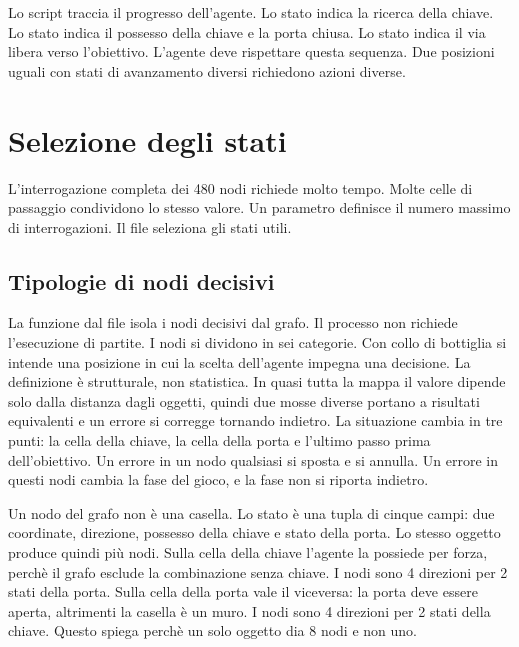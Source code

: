 \documentclass[12pt,a4paper]{article}
\begin{document}
Lo script  traccia il progresso dell'agente. Lo stato  indica la ricerca della chiave. Lo stato  indica il possesso della chiave e la porta chiusa. Lo stato  indica il via libera verso l'obiettivo. L'agente deve rispettare questa sequenza. Due posizioni uguali con stati di avanzamento diversi richiedono azioni diverse.

\section{Selezione degli stati}\label{sec:stati}
L'interrogazione completa dei 480 nodi richiede molto tempo. Molte celle di passaggio condividono lo stesso valore. Un parametro definisce il numero massimo di interrogazioni. Il file  seleziona gli stati utili.

\subsection{Tipologie di nodi decisivi}\label{subsec:bottleneck}
La funzione  dal file  isola i nodi decisivi dal grafo. Il processo non richiede l'esecuzione di partite. I nodi si dividono in sei categorie.
Con collo di bottiglia si intende una posizione in cui la scelta dell'agente impegna una decisione. La definizione \`e strutturale, non statistica. In quasi tutta la mappa il valore dipende solo dalla distanza dagli oggetti, quindi due mosse diverse portano a risultati equivalenti e un errore si corregge tornando indietro. La situazione cambia in tre punti: la cella della chiave, la cella della porta e l'ultimo passo prima dell'obiettivo. Un errore in un nodo qualsiasi si sposta e si annulla. Un errore in questi nodi cambia la fase del gioco, e la fase non si riporta indietro.

Un nodo del grafo non \`e una casella. Lo stato \`e una tupla di cinque campi: due coordinate, direzione, possesso della chiave e stato della porta. Lo stesso oggetto produce quindi pi\`u nodi. Sulla cella della chiave l'agente la possiede per forza, perch\`e il grafo esclude la combinazione senza chiave. I nodi sono 4 direzioni per 2 stati della porta. Sulla cella della porta vale il viceversa: la porta deve essere aperta, altrimenti la casella \`e un muro. I nodi sono 4 direzioni per 2 stati della chiave. Questo spiega perch\`e un solo oggetto dia 8 nodi e non uno.
\end{document}

